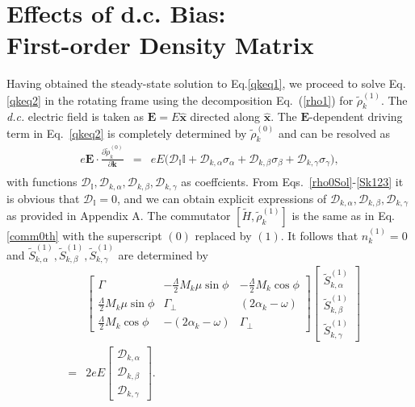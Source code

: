 \documentclass[reprint,amsmath,amssymb,aps,prb]{revtex4-1}
\begin{document}
\section{Effects of d.c. Bias: \\ First-order Density Matrix} \label{sec:p1st}

Having obtained the steady-state solution to Eq.\eqref{qkeq1}, we proceed to solve Eq.\eqref{qkeq2} in the rotating frame using the decomposition Eq.~(\ref{rho1}) for $\tilde{\rho}_k^{(1)}$. 
The \textit{d.c.} electric field is taken as $\bm{E}=E\hat{\bm{x}}$ directed along $\hat{\bm{x}}$. The $\bm{E}$-dependent driving term in Eq.~\eqref{qkeq2}  is completely determined by $\tilde{\rho}_k^{(0)}$ and can be resolved as 
%
\begin{eqnarray} \label{Ddef}
e\bm{E}\cdot\frac{\partial \tilde{\rho}_k^{(0)}}{\partial \bm{k}}
&=&eE\bigg(\mathcal{D}_\mathbb{I}\mathbb{I}+\mathcal{D}_{k,\alpha}\sigma_\alpha+\mathcal{D}_{k,\beta}\sigma_\beta+\mathcal{D}_{k,\gamma}\sigma_\gamma\bigg), \nonumber \\
\end{eqnarray}
%
with functions $\mathcal{D}_{\mathbb{I}}, \mathcal{D}_{k,\alpha}, \mathcal{D}_{k,\beta}, \mathcal{D}_{k,\gamma}$ as coeffcients. From Eqs.~\eqref{rho0Sol}-\eqref{Sk123} it is obvious that $\mathcal{D}_{\mathbb{I}} = 0$, and we can obtain explicit expressions of $\mathcal{D}_{k,\alpha}, \mathcal{D}_{k,\beta}, \mathcal{D}_{k,\gamma}$ as provided in Appendix A.  
The commutator $[\tilde{H}, \tilde{\rho}_k^{(1)}]$ is the same as in Eq.\eqref{comm0th} with the superscript $(0)$ replaced by $(1)$. 
It follows that $n_k^{(1)} = 0$ and 
$\tilde{S}_{k,\alpha}^{(1)},\tilde{S}_{k,\beta}^{(1)},\tilde{S}_{k,\gamma}^{(1)}$ are determined by
%
\begin{eqnarray}
&&\begin{bmatrix}
\Gamma & -\frac{\Lambda}{2}M_k\mu\sin\phi & -\frac{\Lambda}{2}M_k\cos\phi \\
\frac{\Lambda}{2}M_k\mu\sin\phi &\Gamma_\perp& \left(2\alpha_k -\omega\right) \\
\frac{\Lambda}{2}M_k\cos\phi &- \left(2\alpha_k -\omega\right)&\Gamma_\perp 
\end{bmatrix}
%                                                                                                                             
\begin{bmatrix}
\tilde{S}_{k,\alpha}^{(1)} \\ \tilde{S}_{k,\beta}^{(1)}\\ \tilde{S}_{k,\gamma}^{(1)}
\end{bmatrix} \nonumber \\
                 &=&2eE\begin{bmatrix} \mathcal{D}_{k,\alpha} \\ \mathcal{D}_{k,\beta} \\ \mathcal{D}_{k,\gamma} \end{bmatrix}. \label{matrixBCD}
\end{eqnarray}
\end{document}
